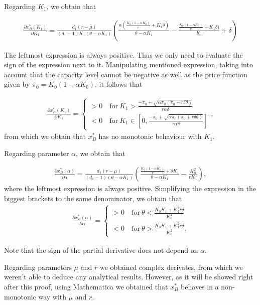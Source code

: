 Regarding $K_1$, we obtain that

\begin{align*}
\frac{\partial x^*_B ( K_1 ) }{\partial K_1}= 
\frac{d_1 (r-\mu )}{ (d_1-1)K_1(\theta-\alpha K_1)}  \left( \frac{\alpha (\frac{K_0(1-\alpha K_0)}{r}+K_1 \delta )}{\theta-\alpha K_1} -\frac{ \frac{K_0(1-\alpha K_0)}{r}+K_1 \delta )}{K_1}+ \delta \right)
\end{align*}


The leftmost expression is always positive. Thus we only need to evaluate the sign of the expression next to it. Manipulating mentioned expression, taking into account that the capacity level cannot be negative as well as the price function given by $\pi_0=K_0(1-\alpha K_0)$, it follows that

\begin{align*}
\frac{\partial x^*_B ( K_1 ) }{\partial K_1}= 
\begin{cases}
>0 &\ \text{for} \ K_1>\frac{-\pi_0+\sqrt{\alpha \pi_0 (\pi_0 + r \delta \theta)}}{ r\alpha \delta}\\
<0 &\ \text{for} \ K_1 \in \left[ 0, \frac{-\pi_0+\sqrt{\alpha \pi_0(\pi_0 + r \delta \theta)}}{ r\alpha \delta} \right]
\end{cases},
\end{align*}
from which we obtain that $x^*_B$ has no monotonic behaviour with $K_1$.


Regarding parameter $\alpha$, we obtain that

\begin{align*}
\frac{\partial x^*_B ( \alpha ) }{\partial \alpha}= 
\frac{d_1 (r-\mu )}{ (d_1-1)(\theta-\alpha K_1)}  \left( \frac{\frac{K_0(1-\alpha K_0)}{r}+ \delta K_1  }{\theta-\alpha K_1} -\frac{ K_0^2}{r K_1} \right),
\end{align*}
where the leftmost expression is always positive. Simplifying the expression in the biggest brackets to the same denominator, we obtain that
\begin{align*}
\frac{\partial x^*_B ( \alpha ) }{\partial \alpha}= 
\begin{cases}
>0 &\ \text{for} \ \theta < \frac{K_0 K_1 +K_1^2 r\delta}{K_0^2}\\
<0 &\ \text{for} \ \theta > \frac{K_0 K_1 +K_1^2 r\delta}{K_0^2}.
\end{cases}
\end{align*}

Note that the sign of the partial derivative does not depend on $\alpha$.

Regarding parameters $\mu$ and $r$ we obtained complex derivates, from which we weren't able to deduce any analytical results. However, as it will be showed right after this proof, using Mathematica we obtained that $x^*_B$ behaves in a non-monotonic way with $\mu$ and $r$.

